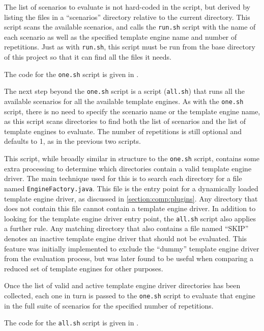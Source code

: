 The list of scenarios to evaluate is not hard-coded in the script, but derived by listing the files in a \enquote{scenarios} directory relative to the current directory. This script scans the available scenarios, and calls the \texttt{run.sh} script with the name of each scenario as well as the specified \gls{template engine} name and number of repetitions. Just as with \texttt{run.sh}, this script must be run from the base directory of this project so that it can find all the files it needs.

The code for the \texttt{one.sh} script is given in .

The next step beyond the \texttt{one.sh} script is a script (\texttt{all.sh}) that runs all the available scenarios for all the available \gls{template engine}s. As with the \texttt{one.sh} script, there is no need to specify the scenario name or the \gls{template engine} name, as this script scans directories to find both the list of scenarios and the list of \gls{template engine}s to evaluate. The number of repetitions is still optional and defaults to 1, as in the previous two scripts.

This script, while broadly similar in structure to the \texttt{one.sh} script, contains some extra processing to determine which directories contain a valid \gls{template engine} driver. The main technique used for this is to search each directory for a file named \texttt{EngineFactory.java}. This file is the entry point for a dynamically loaded \gls{template engine} driver, as discussed in \autoref{section:comp:plugins}. Any directory that does not contain this file cannot contain a \gls{template engine} driver. In addition to looking for the \gls{template engine} driver entry point, the \texttt{all.sh} script also applies a further rule. Any matching directory that also contains a file named \enquote{SKIP} denotes an inactive \gls{template engine} driver that should not be evaluated. This feature was initially implemented to exclude the \enquote{dummy} \gls{template engine} driver from the evaluation process, but was later found to be useful when comparing a reduced set of \gls{template engine}s for other purposes.

Once the list of valid and active \gls{template engine} driver directories has been collected, each one in turn is passed to the \texttt{one.sh} script to evaluate that engine in the full suite of scenarios for the specified number of repetitions.

The code for the \texttt{all.sh} script is given in .

